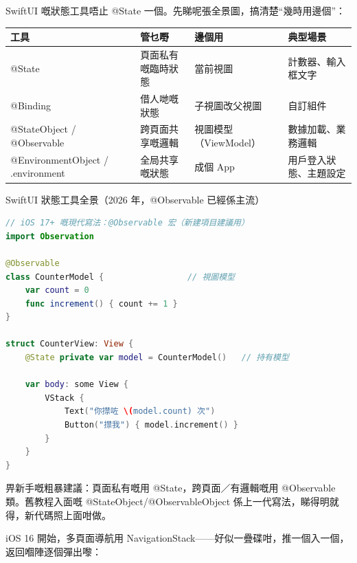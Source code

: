 


SwiftUI 嘅狀態工具唔止 @State 一個。先睇呢張全景圖，搞清楚“幾時用邊個”：

\begin{center}
\begin{tabularx}{\linewidth}{|X|X|X|X|}
\hline
\textbf{工具} & \textbf{管乜嘢} & \textbf{邊個用} & \textbf{典型場景} \tabularnewline
\hline
@State & 頁面私有嘅臨時狀態 & 當前視圖 & 計數器、輸入框文字 \tabularnewline
@Binding & 借人哋嘅狀態 & 子視圖改父視圖 & 自訂組件 \tabularnewline
@StateObject / @Observable & 跨頁面共享嘅邏輯 & 視圖模型（ViewModel） & 數據加載、業務邏輯 \tabularnewline
@EnvironmentObject / .environment & 全局共享嘅狀態 & 成個 App & 用戶登入狀態、主題設定 \tabularnewline
\hline
\end{tabularx}
\end{center}

\begin{center}\small\color{gray}SwiftUI 狀態工具全景（2026 年，@Observable 已經係主流）\end{center}

\begin{lstlisting}[language=Swift]
// iOS 17+ 嘅現代寫法：@Observable 宏（新建項目建議用）
import Observation

@Observable
class CounterModel {                 // 視圖模型
    var count = 0
    func increment() { count += 1 }
}

struct CounterView: View {
    @State private var model = CounterModel()   // 持有模型

    var body: some View {
        VStack {
            Text("你㩒咗 \(model.count) 次")
            Button("㩒我") { model.increment() }
        }
    }
}
\end{lstlisting}

畀新手嘅粗暴建議：頁面私有嘅用 @State，跨頁面／有邏輯嘅用 @Observable 類。舊教程入面嘅 @StateObject/@ObservableObject 係上一代寫法，睇得明就得，新代碼照上面咁做。


iOS 16 開始，多頁面導航用 NavigationStack——好似一疊碟咁，推一個入一個，返回嗰陣逐個彈出嚟：

